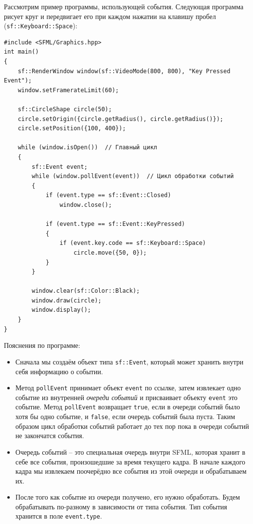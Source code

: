 \documentclass{article}
\begin{document}
Рассмотрим пример программы, использующей события. Следующая программа рисует круг и передвигает его при каждом нажатии на клавишу пробел (\texttt{sf::Keyboard::Space}):
\begin{lstlisting}
#include <SFML/Graphics.hpp>
int main()
{
    sf::RenderWindow window(sf::VideoMode(800, 800), "Key Pressed Event");
    window.setFramerateLimit(60);

    sf::CircleShape circle(50);
    circle.setOrigin({circle.getRadius(), circle.getRadius()});
    circle.setPosition({100, 400});

    while (window.isOpen())  // Главный цикл
    {
        sf::Event event;
        while (window.pollEvent(event))  // Цикл обработки событий
        {
            if (event.type == sf::Event::Closed)
                window.close();
                
            if (event.type == sf::Event::KeyPressed)
            {
                if (event.key.code == sf::Keyboard::Space)
                    circle.move({50, 0});
            }
        }

        window.clear(sf::Color::Black);
        window.draw(circle);
        window.display();
    }
}
\end{lstlisting}
Пояснения по программе:
\begin{itemize}
\item Сначала мы создаём объект типа \texttt{sf::Event}, который может хранить внутри себя информацию о событии.

\item Метод \texttt{pollEvent} принимает объект \texttt{event} по ссылке, затем извлекает одно событие из внутренней \textit{очереди событий} и присваивает объекту \texttt{event} это событие. Метод \texttt{pollEvent} возвращает \texttt{true}, если в очереди событий было хотя бы одно событие, и \texttt{false}, если очередь событий была пуста. Таким образом цикл обработки событий работает до тех пор пока в очереди событий не закончатся события.

\item Очередь событий -- это специальная очередь внутри SFML, которая хранит в себе все события, произошедшие за время текущего кадра. В начале каждого кадра мы извлекаем поочерёдно все события из этой очереди и обрабатываем их.

\item После того как событие из очереди получено, его нужно обработать. Будем обрабатывать по-разному в зависимости от типа события. Тип события хранится в поле \texttt{event.type}.
\end{itemize}
\end{document}
